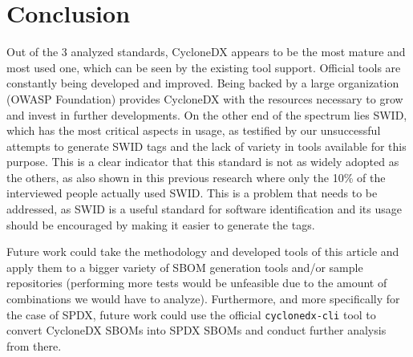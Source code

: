 \section{Conclusion}

Out of the 3 analyzed standards, CycloneDX appears to be the most mature and most used one, which can be seen by the existing tool support. Official tools are constantly being developed and improved. Being backed by a large organization (OWASP Foundation) provides CycloneDX with the resources necessary to grow and invest in further developments. On the other end of the spectrum lies SWID, which has the most critical aspects in usage, as testified by our unsuccessful attempts to generate SWID tags and the lack of variety in tools available for this purpose. This is a clear indicator that this standard is not as widely adopted as the others, as also shown in this previous research \cite{article:software-bom} where only the 10\% of the interviewed people actually used SWID.  This is a problem that needs to be addressed, as SWID is a useful standard for software identification and its usage should be encouraged by making it easier to generate the tags.

Future work could take the methodology and developed tools of this article and apply them to a bigger variety of SBOM generation tools and/or sample repositories (performing more tests would be unfeasible due to the amount of combinations we would have to analyze). Furthermore, and more specifically for the case of SPDX, future work could use the official \verb|cyclonedx-cli| tool to convert CycloneDX SBOMs into SPDX SBOMs and conduct further analysis from there.